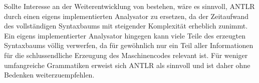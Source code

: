 Sollte Interesse an der Weiterentwicklung von \toya bestehen, wäre es sinnvoll, ANTLR durch einen eigens implementierten Analysator zu ersetzen, da der Zeitaufwand des vollständigen Syntaxbaums mit steigender Komplexität erheblich zunimmt. Ein eigens implementierter Analysator hingegen kann viele Teile des erzeugten Syntaxbaums völlig verwerfen, da für gewöhnlich nur ein Teil aller Informationen für die schlussendliche Erzeugung des Maschinencodes relevant ist. Für weniger umfangreiche Grammatiken erweist sich ANTLR als sinnvoll und ist daher ohne Bedenken weiterzuempfehlen.